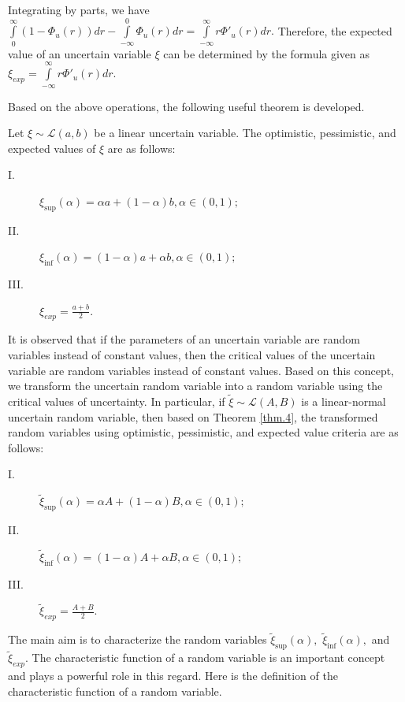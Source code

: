 \begin{remark}
	Integrating by parts, we have 
	$\int\limits_{0}^{\infty}(1-\Phi_u(r))dr-
	\int\limits_{-\infty}^{0}\Phi_u(r)dr=\int\limits_{-\infty}^{\infty}r{\Phi'_u}(r)dr.$ Therefore, the expected value of an uncertain variable $\xi$ can be determined by the formula given as $\xi_{exp}=\int\limits_{-\infty}^{\infty}r{\Phi'_u}(r)dr.$ 
\end{remark}
\par Based on the above operations, the following useful theorem is developed.
\begin{theorem}\cite{Liu 2015,Yang 2015}\label{thm.4}
	Let $\xi\sim \mathcal{L}(a,b)$ be a linear uncertain variable. The optimistic, pessimistic, and expected values of $\xi$ are as follows:
	\begin{description}
		\item[ I.] $\xi_{\sup}(\alpha)=\alpha a+(1-\alpha)b,\alpha\in (0,1);$
		\item[ II.] $\xi_{\inf}(\alpha)=(1-\alpha)a+\alpha b,\alpha\in (0,1);$
		\item[ III.] $\xi_{exp}=\frac{a+b}{2}.$
	\end{description} 
\end{theorem} 
\par It is observed that if the parameters of an uncertain variable are random variables instead of constant values, then the critical values of the uncertain variable are random variables instead of constant values. Based on this concept, we transform the uncertain random variable into a random variable using the critical values of uncertainty.  In particular, if $\tilde{\xi}\sim \mathcal{L}(A,B)$ is a linear-normal uncertain random variable, then based on Theorem \ref{thm.4}, the transformed random variables using optimistic, pessimistic, and expected value criteria are as follows:
\begin{description}
	\item[ I.] $\tilde\xi_{\sup}(\alpha)=\alpha A+(1-\alpha)B,\alpha\in (0,1);$
	\item[ II.] $\tilde\xi_{\inf}(\alpha)=(1-\alpha)A+\alpha B,\alpha\in (0,1);$
	\item[ III.] $\tilde\xi_{exp}=\frac{A+B}{2}.$
\end{description} 
\par The main aim is to characterize the random variables $\tilde\xi_{\sup}(\alpha),$ $\tilde\xi_{\inf}(\alpha),$ and $\tilde\xi_{exp}.$ The characteristic function of a random variable is an important concept and plays a powerful role in this regard. Here is the definition of the characteristic function of a random variable.
